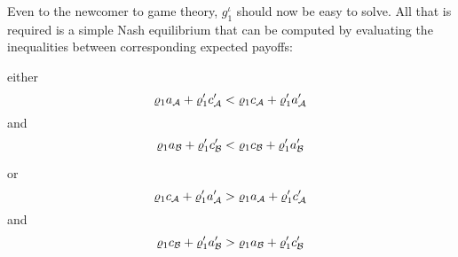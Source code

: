 
% 

%


Even to the newcomer to game theory, $g^\iota_1$ should now be easy to solve. All that is required is a simple Nash equilibrium that can be computed by evaluating the inequalities between corresponding expected payoffs:

\noindent either \[ \varrho_1a_{\cal A} + \varrho'_1c'_{\cal A} < \varrho_1c_{\cal A} + \varrho'_1a'_{\cal A} \]
\noindent and \[ \varrho_1a_{\cal B} + \varrho'_1c'_{\cal B} < \varrho_1c_{\cal B} + \varrho'_1a'_{\cal B} \]

\noindent or \[ \varrho_1c_{\cal A} + \varrho'_1a'_{\cal A} > \varrho_1a_{\cal A} + \varrho'_1c'_{\cal A} \]
\noindent and \[ \varrho_1c_{\cal B} + \varrho'_1a'_{\cal B} > \varrho_1a_{\cal B} + \varrho'_1c'_{\cal B} \]

